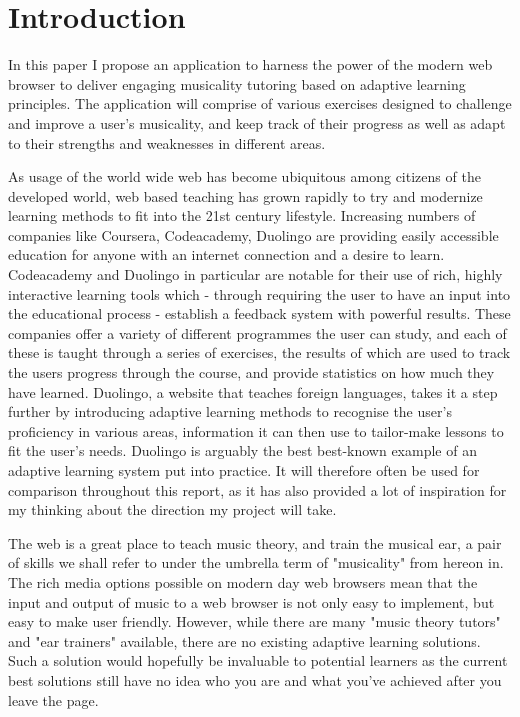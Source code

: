 \chapter{Introduction}

\par In this paper I propose an application to harness the power of the modern web browser to deliver engaging musicality tutoring based on adaptive learning principles. The application will comprise of various exercises designed to challenge and improve a user's musicality, and keep track of their progress as well as adapt to their strengths and weaknesses in different areas.
\vspace{1em}
\par
As usage of the world wide web has become ubiquitous among citizens of the developed world, web based teaching has grown rapidly to try and modernize learning methods to fit into the 21st century lifestyle. Increasing numbers of companies like Coursera\cite{coursera}, Codeacademy\cite{codeacademy}, Duolingo\cite{duolingo} are providing easily accessible education for anyone with an internet connection and a desire to learn. Codeacademy and Duolingo in particular are notable for their use of rich, highly interactive learning tools which - through requiring the user to have an input into the educational process - establish a feedback system with powerful results\cite{vesselinov2012duolingo}. These companies offer a variety of different programmes the user can study, and each of these is taught through a series of exercises, the results of which are used to track the users progress through the course, and provide statistics on how much they have learned. Duolingo, a website that teaches foreign languages, takes it a step further by introducing adaptive learning methods to recognise the user's proficiency in various areas, information it can then use to tailor-make lessons to fit the user's needs. Duolingo is arguably the best best-known example of an adaptive learning system put into practice. It will therefore often be used for comparison throughout this report, as it has also provided a lot of inspiration for my thinking about the direction my project will take.
\vspace{1em}
\par
The web is a great place to teach music theory, and train the musical ear, a pair of skills we shall refer to under the umbrella term of "musicality" from hereon in. The rich media options possible on modern day web browsers mean that the input and output of music to a web browser is not only easy to implement, but easy to make user friendly. However, while there are many "music theory tutors" and "ear trainers" available, there are no existing adaptive learning solutions. Such a solution would hopefully be invaluable to potential learners as the current best solutions still have no idea who you are and what you've achieved after you leave the page.
\par

